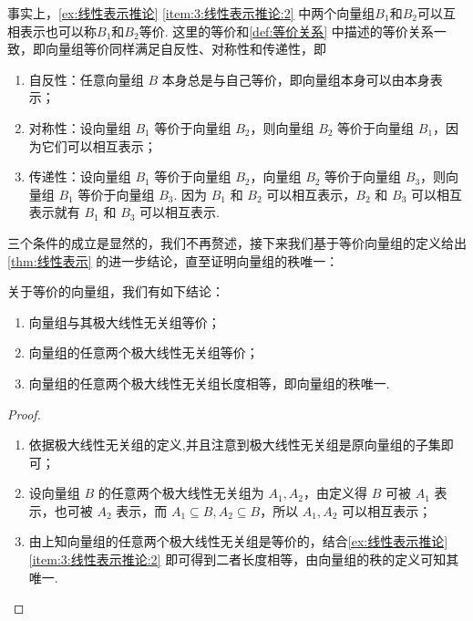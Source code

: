 事实上，\autoref{ex:线性表示推论} \ref*{item:3:线性表示推论:2} 中两个向量组$B_1$和$B_2$可以互相表示也可以称$B_1$和$B_2$等价. 这里的等价和\autoref{def:等价关系} 中描述的等价关系一致，即向量组等价同样满足自反性、对称性和传递性，即
\begin{enumerate}
    \item 自反性：任意向量组 $B$ 本身总是与自己等价，即向量组本身可以由本身表示；

    \item 对称性：设向量组 $B_1$ 等价于向量组 $B_2$，则向量组 $B_2$ 等价于向量组 $B_1$，因为它们可以相互表示；

    \item 传递性：设向量组 $B_1$ 等价于向量组 $B_2$，向量组 $B_2$ 等价于向量组 $B_3$，则向量组 $B_1$ 等价于向量组 $B_3$. 因为 $B_1$ 和 $B_2$ 可以相互表示，$B_2$ 和 $B_3$ 可以相互表示就有 $B_1$ 和 $B_3$ 可以相互表示.
\end{enumerate}
三个条件的成立是显然的，我们不再赘述，接下来我们基于等价向量组的定义给出\autoref{thm:线性表示} 的进一步结论，直至证明向量组的秩唯一：
\begin{corollary}{}{}
    关于等价的向量组，我们有如下结论：
    \begin{enumerate}
        \item 向量组与其极大线性无关组等价；

        \item 向量组的任意两个极大线性无关组等价；

        \item 向量组的任意两个极大线性无关组长度相等，即向量组的秩唯一.
    \end{enumerate}
\end{corollary}

\begin{proof}
    \begin{enumerate}
        \item 依据极大线性无关组的定义,并且注意到极大线性无关组是原向量组的子集即可；

        \item 设向量组 $B$ 的任意两个极大线性无关组为 $A_1, A_2$，由定义得 $B$ 可被 $A_1$ 表示，也可被 $A_2$ 表示，而 $A_1 \subseteq B, A_2 \subseteq B$，所以 $A_1, A_2$ 可以相互表示；

        \item 由上知向量组的任意两个极大线性无关组是等价的，结合\autoref{ex:线性表示推论} \ref*{item:3:线性表示推论:2} 即可得到二者长度相等，由向量组的秩的定义可知其唯一.
    \end{enumerate}
\end{proof}

